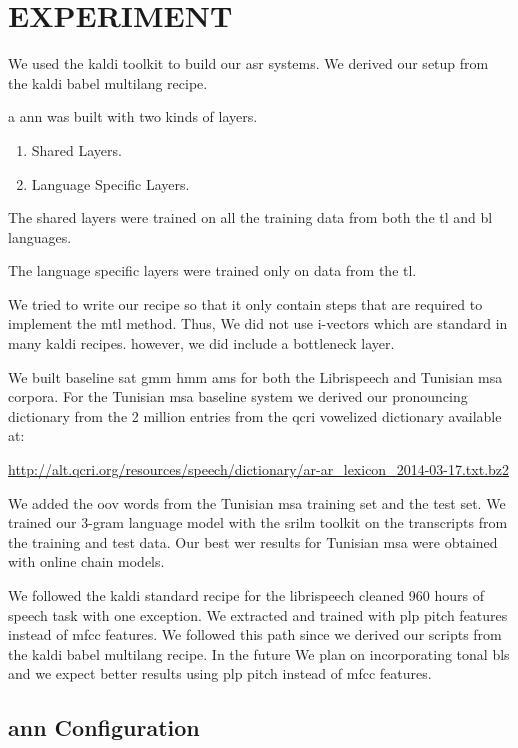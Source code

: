 \section{EXPERIMENT}
\label{sec-4}

We used the kaldi toolkit\cite{Povey11thekaldi} to build our \gls{asr} systems. 
We derived our setup from the kaldi babel multilang recipe. 

a \gls{ann} was built with two kinds of layers.
\begin{enumerate}
\item Shared Layers.
\item Language Specific Layers.
\end{enumerate}

The shared layers were trained on all the training data from both the \gls{tl} and \gls{bl} languages.

The language specific layers were trained only on data from the \gls{tl}.

We  tried to write our recipe so that  it only contain  steps that are required to implement the \gls{mtl} method. 
Thus, We did not use i-vectors which are standard in many kaldi recipes. 
however, we did include  a bottleneck layer. 

We built baseline \gls{sat} \gls{gmm} \gls{hmm} \glspl{am} for both the Librispeech and Tunisian \gls{msa} corpora.
For the Tunisian \gls{msa} baseline system we derived our pronouncing dictionary from the 2 million entries from the \gls{qcri} vowelized dictionary\cite{aaliArabicKaldi} available at:

\url{http://alt.qcri.org/resources/speech/dictionary/ar-ar_lexicon_2014-03-17.txt.bz2}

We added the \gls{oov} words from the Tunisian \gls{msa} training set and the test set. 
We trained our $3$-gram language model with the \gls{srilm} toolkit\cite{Stolcke02srilm-} on the transcripts from the training and test data. 
Our best \gls{wer} results for Tunisian \gls{msa} were obtained with online chain models.

We followed the kaldi standard recipe for the librispeech cleaned 960 hours of speech task with one exception. 
We extracted and trained with \gls{plp} pitch features instead of \gls{mfcc} features. 
We followed this path since we derived our scripts from the kaldi babel multilang recipe. 
In the future We plan on incorporating tonal \glspl{bl} and we expect better results using \gls{plp} pitch instead of \gls{mfcc} features. 

\subsection{\gls{ann} Configuration}
\label{sec:nnconfig}


